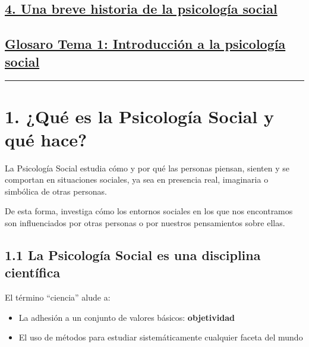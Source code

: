\documentclass[
]{website}
\providecommand{\tightlist}{%
  \setlength{\itemsep}{0pt}\setlength{\parskip}{0pt}}
\begin{document}
\subsection*{\texorpdfstring{\hyperref[tema4]{4. Una breve historia de la psicología social}}{4. Una breve historia de la psicología social}}\label{una-breve-historia-de-la-psicologuxeda-social}

\subsection*{\texorpdfstring{\hyperref[glosario1]{Glosaro Tema 1: Introducción a la psicología social}}{Glosaro Tema 1: Introducción a la psicología social}}\label{glosaro-tema-1-introducciuxf3n-a-la-psicologuxeda-social}

\begin{center}\rule{0.5\linewidth}{0.5pt}\end{center}

\section*{1. ¿Qué es la Psicología Social y qué hace?}\label{tema1}

La Psicología Social estudia cómo y por qué las personas piensan, sienten y se comportan en situaciones sociales, ya sea en presencia real, imaginaria o simbólica de otras personas.

De esta forma, investiga cómo los entornos sociales en los que nos encontramos son influenciados por otras personas o por nuestros pensamientos sobre ellas.

\subsection*{1.1 La Psicología Social es una disciplina científica}\label{subtema1_1}

El término ``ciencia'' alude a:

\begin{itemize}
\tightlist
\item
  La adhesión a un conjunto de valores básicos: \textbf{objetividad}
\item
  El uso de métodos para estudiar sistemáticamente cualquier faceta del mundo
\end{itemize}
\end{document}

